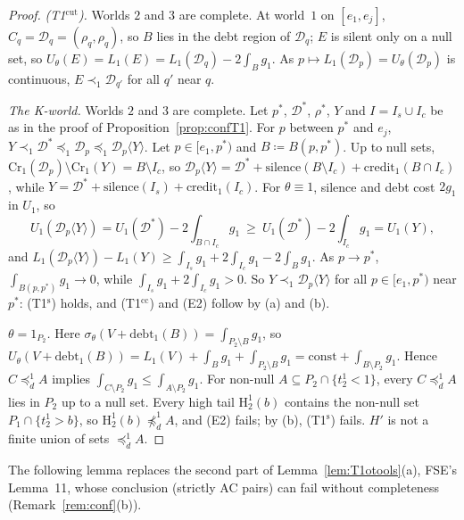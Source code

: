 \documentclass[11pt]{article}
\theoremstyle{definition}\newtheorem{definition}[theorem]{Definition}
\theoremstyle{remark}\newtheorem{remark}[theorem]{Remark}
\newcommand{\Dscr}{\mathcal D}
\newcommand{\debt}{\mathrm{debt}}
\newcommand{\cred}{\mathrm{credit}}
\newcommand{\sil}{\mathrm{silence}}
\newcommand{\Hi}[3]{\mathrm H^{#1}_{#2}(#3)}
\newcommand{\Ts}{\textup{(T1$^{\mathrm s}$)}}
\newcommand{\Tcc}{\textup{(T1$^{\mathrm{cc}}$)}}
\newcommand{\Tcut}{\textup{(T1$^{\mathrm{cut}}$)}}
\begin{document}
\begin{proof}
\emph{\Tcut.} Worlds $2$ and $3$ are complete. At world~$1$ on
$[e_1,e_j]$, $C_q=\Dscr_q=(\rho_q,\rho_q)$, so $B$ lies in the debt region
of $\Dscr_q$; $E$ is silent only on a null set, so
$U_\theta(E)=L_1(E)=L_1(\Dscr_q)-2\int_Bg_1$. As $p\mapsto L_1(\Dscr_p)=
U_\theta(\Dscr_p)$ is continuous, $E\prec_1\Dscr_{q'}$ for all $q'$ near
$q$.

\emph{The K-world.} Worlds $2$ and $3$ are complete. Let $p^*$, $\Dscr^*$,
$\rho^*$, $Y$ and $I=I_s\cup I_c$ be as in the proof of
Proposition~\ref{prop:confT1}. For $p$ between $p^*$ and $e_j$,
$Y\prec_1\Dscr^*\preceq_1\Dscr_p\preceq_1\Dscr_p\langle Y\rangle$. Let
$p\in[e_1,p^*)$ and $B\coloneqq B(p,p^*)$. Up to null sets,
$\mathrm{Cr}_1(\Dscr_p)\setminus\mathrm{Cr}_1(Y)=B\setminus I_c$, so
$\Dscr_p\langle Y\rangle=\Dscr^*+\sil(B\setminus I_c)+\cred_1(B\cap I_c)$,
while $Y=\Dscr^*+\sil(I_s)+\cred_1(I_c)$. For $\theta\equiv1$, silence and
debt cost $2g_1$ in $U_1$, so
\[
 U_1(\Dscr_p\langle Y\rangle)=U_1(\Dscr^*)-2\int_{B\cap I_c}g_1\ \ge\
 U_1(\Dscr^*)-2\int_{I_c}g_1=U_1(Y),
\]
and $L_1(\Dscr_p\langle Y\rangle)-L_1(Y)\ge\int_{I_s}g_1+2\int_{I_c}g_1
-2\int_Bg_1$. As $p\to p^*$, $\int_{B(p,p^*)}g_1\to0$, while
$\int_{I_s}g_1+2\int_{I_c}g_1>0$. So $Y\prec_1\Dscr_p\langle Y\rangle$ for
all $p\in[e_1,p^*)$ near $p^*$: \Ts{} holds, and \Tcc{} and (E2) follow by
(a) and (b).

\emph{$\theta=1_{P_2}$.} Here $\sigma_\theta(V+\debt_1(B))=
\int_{P_2\setminus B}g_1$, so $U_\theta(V+\debt_1(B))=L_1(V)+\int_Bg_1+
\int_{P_2\setminus B}g_1=\mathrm{const}+\int_{B\setminus P_2}g_1$. Hence
$C\preceq^1_dA$ implies $\int_{C\setminus P_2}g_1\le\int_{A\setminus
P_2}g_1$. For non-null $A\subseteq P_2\cap\{t^1_2<1\}$, every
$C\preceq^1_dA$ lies in $P_2$ up to a null set. Every high tail $\Hi12b$
contains the non-null set $P_1\cap\{t^1_2>b\}$, so $\Hi12b\not\preceq^1_dA$,
and (E2) fails; by (b), \Ts{} fails. $H'$ is not a finite union of sets
$\preceq^1_dA$.
\end{proof}

The following lemma replaces the second part of
Lemma~\ref{lem:T1otools}(a), FSE's Lemma~11, whose conclusion (strictly AC
pairs) can fail without completeness (Remark~\ref{rem:conf}(b)).
\end{document}
